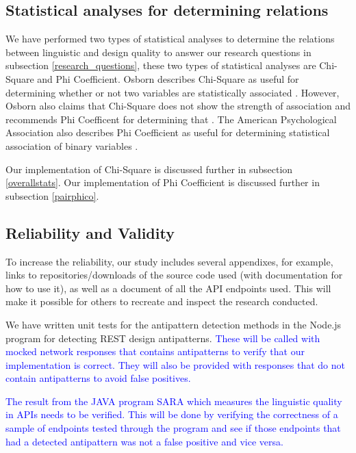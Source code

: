\subsection{Statistical analyses for determining relations} \label{statistics}

We have performed two types of statistical analyses to determine the relations between linguistic and design quality to answer our research questions in subsection \ref{research_questions}, these two types of statistical analyses are Chi-Square and Phi Coefficient. Osborn describes Chi-Square as useful for determining whether or not two variables are statistically associated \cite{Osborn}. However, Osborn also claims that Chi-Square does not show the strength of association and recommends Phi Coefficent for determining that \cite{Osborn}. The American Psychological Association also describes Phi Coefficient as useful for determining statistical association of binary variables \cite{apa}. 

Our implementation of Chi-Square is discussed further in subsection \ref{overallstats}. Our implementation of Phi Coefficient is discussed further in subsection \ref{pairphico}.

\subsection{Reliability and Validity} \label{Reliability and Validity}

To increase the reliability, our study includes several appendixes, for example, links to repositories/downloads of the source code used (with documentation for how to use it), as well as a document of all the API endpoints used. This will make it possible for others to recreate and inspect the research conducted. 

We have written unit tests for the antipattern detection methods in the Node.js program for detecting REST design antipatterns. \textcolor{blue}{These will be called with mocked network responses that contains antipatterns to verify that our implementation is correct. They will also be provided with responses that do not contain antipatterns to avoid false positives.}

\textcolor{blue}{The result from the JAVA program SARA which measures the linguistic quality in APIs needs to be verified. This will be done by verifying the correctness of a sample of endpoints tested through the program and see if those endpoints that had a detected antipattern was not a false positive and vice versa.}

